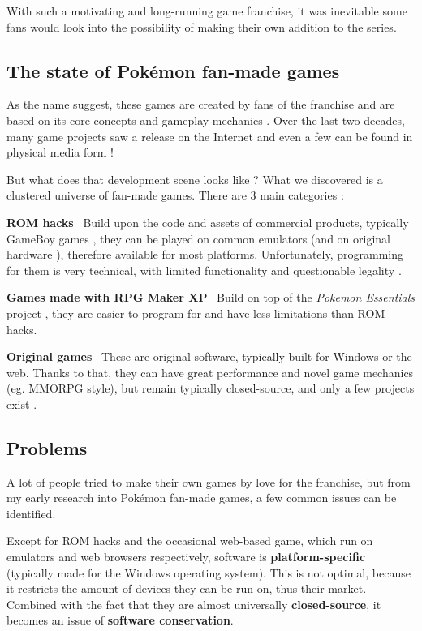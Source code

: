 \documentclass[11pt]{article}
\begin{document}
With such a motivating and long-running game franchise, it was inevitable some fans would look into the possibility of making their own addition to the series.

\subsection{The state of Pokémon fan-made games}

As the name suggest, these games are created by fans of the franchise and are based on its core concepts and gameplay mechanics \cite{PkmnFangames}. Over the last two decades, many game projects saw a release on the Internet and even a few can be found in physical media form \cite{PkmnUV,PkmnCartridge} !

But what does that development scene looks like ? What we discovered is a clustered universe of fan-made games. There are 3 main categories : 

\textbf{ROM hacks} \ Build upon the code and assets of commercial products, typically GameBoy games \cite{PkmnFangames}, they can be played on common emulators (and on original hardware \cite{Homebrew}), therefore available for most platforms. Unfortunately, programming for them is very technical, with limited functionality and questionable legality \cite{PkmnRH}.

\textbf{Games made with RPG Maker XP} \ Build on top of the \textit{Pokemon Essentials} project \cite{PkmnFangames,Essentials}, they are easier to program for and have less limitations than ROM hacks.

\textbf{Original games} \  These are original software, typically built for Windows or the web. Thanks to that, they can have great performance and novel game mechanics (eg. MMORPG style), but remain typically closed-source, and only a few projects exist \cite{PkmnPlanet, PkmnLegends, PkmnFanGameList}.


\subsection{Problems}


A lot of people tried to make their own games by love for the franchise, but from my early research into Pokémon fan-made games, a few common issues can be identified.

Except for ROM hacks and the occasional web-based game, which run on emulators and web browsers respectively, software is \textbf{platform-specific} (typically made for the Windows operating system). This is not optimal, because it restricts the amount of devices they can be run on, thus their market. Combined with the fact that they are almost universally \textbf{closed-source}, it becomes an issue of \textbf{software conservation}.
\end{document}
